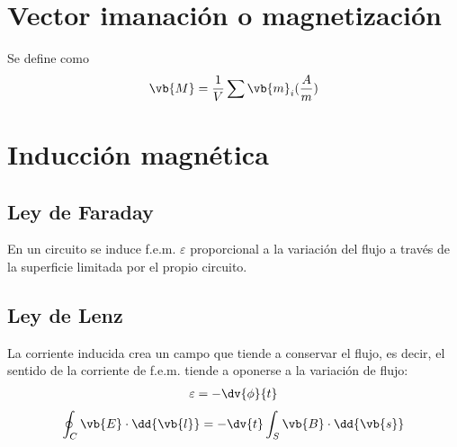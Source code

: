 \documentclass{./FisicaII.tex}
\begin{document}
\section{Vector imanación o magnetización}
Se define como
\begin{equation}
	\begin{split}
		\vb{M} = \frac{1}{V} \sum \vb{m}_{i} (\frac{A}{m})
	\end{split}
\end{equation}
\section{Inducción magnética}
\subsection{Ley de Faraday}
En un circuito se induce f.e.m. $\varepsilon$ proporcional a la variación del flujo a
través de la superficie limitada por el propio circuito.
\subsection{Ley de Lenz}
La corriente inducida crea un campo que tiende a conservar el flujo, es decir, el sentido
de la corriente de f.e.m. tiende a oponerse a la variación de flujo:
\begin{equation}
	\begin{split}
		\varepsilon = -\dv{\phi}{t}
	\end{split}
\end{equation}
\begin{equation}
	\begin{split}
		\oint_{C} \vb{E} \cdot \dd{\vb{l}} = -\dv{t}\int_{S} \vb{B}\cdot \dd{\vb{s}}
	\end{split}
\end{equation}
\end{document}
